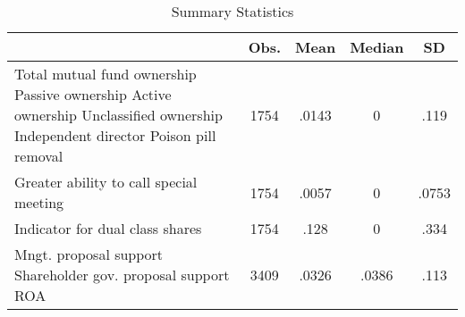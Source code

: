 \begin{table}[htbp]\centering
\def\sym#1{\ifmmode^{#1}\else\(^{#1}\)\fi}
\caption{Summary Statistics}
\begin{tabular}{l*{1}{cccc}}
\hline\hline
                    &        Obs.&        Mean&      Median&          SD\\
\hline
Total mutual fund ownership %
Passive ownership %
Active ownership %
Unclassified ownership %
Independent director %
Poison pill removal &        1754&       .0143&           0&        .119\\
Greater ability to call special meeting&        1754&       .0057&           0&       .0753\\
Indicator for dual class shares&        1754&        .128&           0&        .334\\
Mngt. proposal support %
Shareholder gov. proposal support %
ROA                 &        3409&       .0326&       .0386&        .113\\
\hline\hline
\end{tabular}
\end{table}
